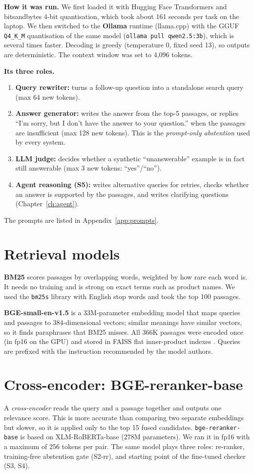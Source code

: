 \documentclass[11pt,a4paper]{report}
\newcommand{\sys}[1]{\textsf{#1}}
\begin{document}
\textbf{How it was run.} We first loaded it with Hugging Face Transformers and bitsandbytes 4-bit quantisation, which took about 161 seconds per task on the laptop. We then switched to the \textbf{Ollama} runtime (llama.cpp) with the GGUF \texttt{Q4\_K\_M} quantisation of the same model (\texttt{ollama pull qwen2.5:3b}), which is several times faster. Decoding is greedy (temperature 0, fixed seed 13), so outputs are deterministic. The context window was set to 4{,}096 tokens.

\textbf{Its three roles.}
\begin{enumerate}
\item \textbf{Query rewriter:} turns a follow-up question into a standalone search query (max 64 new tokens).
\item \textbf{Answer generator:} writes the answer from the top-5 passages, or replies ``I'm sorry, but I don't have the answer to your question.'' when the passages are insufficient (max 128 new tokens). This is the \emph{prompt-only abstention} used by every system.
\item \textbf{LLM judge:} decides whether a synthetic ``unanswerable'' example is in fact still answerable (max 3 new tokens: ``yes''/``no'').
\item \textbf{Agent reasoning (S5):} writes alternative queries for retries, checks whether an answer is supported by the passages, and writes clarifying questions (Chapter~\ref{ch:agent}).
\end{enumerate}
The prompts are listed in Appendix~\ref{app:prompts}.

\section{Retrieval models}
\textbf{BM25} scores passages by overlapping words, weighted by how rare each word is. It needs no training and is strong on exact terms such as product names. We used the \texttt{bm25s} library with English stop words and took the top 100 passages.

\textbf{BGE-small-en-v1.5} \cite{bge} is a 33M-parameter embedding model that maps queries and passages to 384-dimensional vectors; similar meanings have similar vectors, so it finds paraphrases that BM25 misses. All 366K passages were encoded once (in fp16 on the GPU) and stored in FAISS flat inner-product indexes \cite{faiss}. Queries are prefixed with the instruction recommended by the model authors.

\section{Cross-encoder: BGE-reranker-base}
A \emph{cross-encoder} reads the query and a passage together and outputs one relevance score. This is more accurate than comparing two separate embeddings but slower, so it is applied only to the top 15 fused candidates. \texttt{bge-reranker-base} \cite{bge} is based on XLM-RoBERTa-base (278M parameters). We ran it in fp16 with a maximum of 256 tokens per pair. The same model plays three roles: re-ranker, training-free abstention gate (\sys{S2-rr}), and starting point of the fine-tuned checker (\sys{S3}, \sys{S4}).
\end{document}
